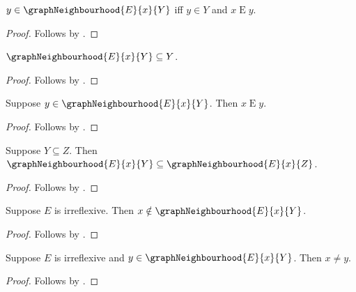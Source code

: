\begin{proposition}\label{graph_neighbourhood_iff}
    $y\in\graphNeighbourhood{E}{x}{Y}$ iff
        $y\in Y$ and $x\mathrel{E}y$.
\end{proposition}
\begin{proof}
    Follows by .
\end{proof}

\begin{proposition}\label{graph_neighbourhood_subseteq}
    $\graphNeighbourhood{E}{x}{Y}\subseteq Y$.
\end{proposition}
\begin{proof}
    Follows by .
\end{proof}

\begin{proposition}\label{graph_neighbourhood_edge}
    Suppose $y\in\graphNeighbourhood{E}{x}{Y}$.
    Then $x\mathrel{E}y$.
\end{proposition}
\begin{proof}
    Follows by .
\end{proof}

\begin{proposition}\label{graph_neighbourhood_monotone}
    Suppose $Y\subseteq Z$.
    Then $\graphNeighbourhood{E}{x}{Y}\subseteq
        \graphNeighbourhood{E}{x}{Z}$.
\end{proposition}
\begin{proof}
    Follows by .
\end{proof}

\begin{proposition}\label{graph_neighbourhood_no_loop}
    Suppose $E$ is irreflexive.
    Then $x\notin\graphNeighbourhood{E}{x}{Y}$.
\end{proposition}
\begin{proof}
    Follows by .
\end{proof}

\begin{proposition}\label{graph_neighbourhood_distinct}
    Suppose $E$ is irreflexive and
        $y\in\graphNeighbourhood{E}{x}{Y}$.
    Then $x\neq y$.
\end{proposition}
\begin{proof}
    Follows by .
\end{proof}

